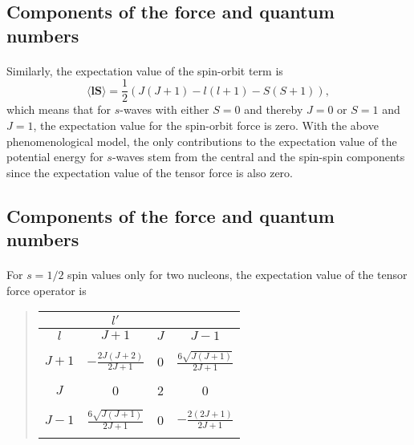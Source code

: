 \documentclass[%
twoside,                 %
final,                   %
10pt]{article}
\begin{document}
\subsection*{Components of the force and quantum numbers}

\paragraph{}

Similarly, the expectation value of the spin-orbit term is 
\[
\langle \mathbf{l}\mathbf{S} \rangle = \frac{1}{2}\left( J(J+1)-l(l+1)-S(S+1)\right),
\]
which means that for $s$-waves with either $S=0$ and thereby $J=0$ or $S=1$ and $J=1$, 
the expectation value for the
spin-orbit force is zero. With the above phenomenological model, the
only contributions to the expectation value of the potential energy for $s$-waves
stem  from the central and the spin-spin components since the
expectation value of the tensor force is also zero.



\subsection*{Components of the force and quantum numbers}

\paragraph{}
 For $s=1/2$ spin values only for two nucleons, the expectation value of the tensor force operator is 


\begin{quote}
\begin{tabular}{cccc}
\hline
\multicolumn{1}{c}{  } & \multicolumn{1}{c}{ $l'$ } & \multicolumn{1}{c}{  } & \multicolumn{1}{c}{  } \\
\hline
$l$   & $J+1$                         & $J$ & $J-1$                         \\
\hline
      &                               &     &                               \\
$J+1$ & $-\frac{2J(J+2)}{2J+1}$       & 0   & $\frac{6\sqrt{J(J+1)}}{2J+1}$ \\
      &                               &     &                               \\
$J$   & 0                             & 2   & 0                             \\
      &                               &     &                               \\
$J-1$ & $\frac{6\sqrt{J(J+1)}}{2J+1}$ & 0   & $-\frac{2(2J+1)}{2J+1}$       \\
      &                               &     &                               \\
\hline
\end{tabular}
\end{quote}
\end{document}
